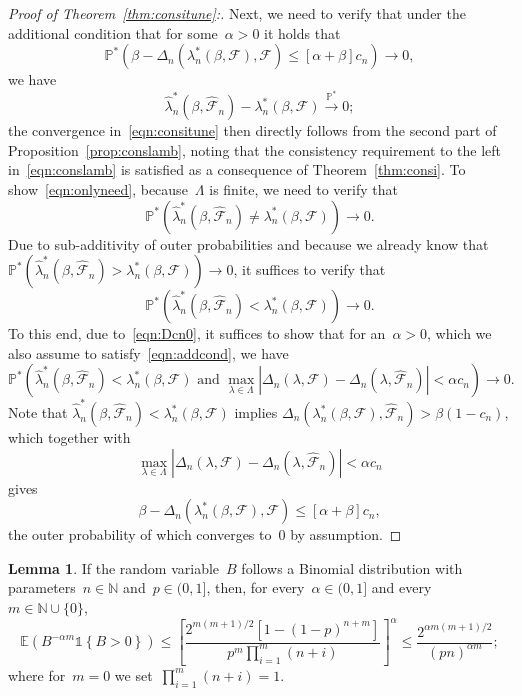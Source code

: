 \documentclass[11pt, a4paper]{article}
\newcommand{\N}{\mathbb{N}}
\newcommand{\cps}{\xrightarrow{\mathbb{P}^*}}
\theoremstyle{definition}
\newtheorem{lemma}[theorem]{Lemma}
\begin{document}
\begin{proof}[Proof of Theorem~\ref{thm:consitune}:]
Next, we need to verify that under the additional condition that for some~$\alpha > 0$ it holds that $$\mathbb{P}^*\left( \beta - \Delta_n\left(\lambda_n^*(\beta, \mathcal{F}), \mathcal{F}\right) \leq [\alpha + \beta]c_n \right) \to 0,$$ we have
\begin{equation}\label{eqn:onlyneed}
\hat{\lambda}_n^*(\beta, \hat{\mathcal{F}}_n) - \lambda_n^*(\beta, \mathcal{F}) \cps 0;
\end{equation}
the convergence in~\eqref{eqn:consitune} then directly follows from the second part of Proposition~\ref{prop:conslamb}, noting that the consistency requirement to the left in~\eqref{eqn:conslamb} is satisfied as a consequence of Theorem~\ref{thm:consi}. To show~\eqref{eqn:onlyneed}, because~$\Lambda$ is finite, we need to verify that $$\mathbb{P}^*\left( \hat{\lambda}_n^*(\beta, \hat{\mathcal{F}}_n) \neq \lambda_n^*(\beta, \mathcal{F}) \right) \to 0.$$ Due to sub-additivity of outer probabilities and because we already know that~$\mathbb{P}^*(\hat{\lambda}_n^*(\beta, \hat{\mathcal{F}}_n) > \lambda_n^*(\beta, \mathcal{F})) \to 0$, it suffices to verify that $$\mathbb{P}^*\left( \hat{\lambda}_n^*(\beta, \hat{\mathcal{F}}_n) < \lambda_n^*(\beta, \mathcal{F}) \right) \to 0.$$ To this end, due to~\eqref{eqn:Dcn0}, it suffices to show that for an~$\alpha > 0$, which we also assume to satisfy~\eqref{eqn:addcond}, we have $$\mathbb{P}^*\left( \hat{\lambda}_n^*(\beta, \hat{\mathcal{F}}_n) < \lambda_n^*(\beta, \mathcal{F}) \text{ and } \max_{\lambda \in \Lambda}|\Delta_n(\lambda, \mathcal{F}) - \Delta_n(\lambda, \hat{\mathcal{F}}_n)| < \alpha c_n \right) \to 0.$$ Note that $\hat{\lambda}_n^*(\beta, \hat{\mathcal{F}}_n) < \lambda_n^*(\beta, \mathcal{F})$ implies $\Delta_n(\lambda_n^*(\beta, \mathcal{F}), \hat{\mathcal{F}}_n) > \beta (1-c_n)$, which together with~$$\max_{\lambda \in \Lambda}|\Delta_n(\lambda, \mathcal{F}) - \Delta_n(\lambda, \hat{\mathcal{F}}_n)| < \alpha c_n$$ gives $$\beta - \Delta_n(\lambda_n^*(\beta, \mathcal{F}), \mathcal{F}) \leq [\alpha + \beta]c_n,$$ the outer probability of which converges to~$0$ by assumption.
\end{proof}

\begin{lemma}\label{lem:bin2}
If the random variable~$B$ follows a Binomial distribution with parameters~$n \in \N$ and~$p \in (0, 1]$, then, for every~$\alpha \in (0, 1]$ and every~$m \in \N \cup \{0\}$, 
%
\begin{equation}\label{in:bin}
\mathbb{E}\left(B^{-\alpha m} \mathds{1}\left\{B > 0\right\}\right) \leq \left[\frac{2^{m(m+1)/2}[1-(1-p)^{n+m}]}{p^m \prod_{i = 1}^m (n+i) }\right]^\alpha \leq \frac{2^{\alpha m(m+1)/2}}{(pn)^{\alpha m}};
\end{equation}
% 
where for~$m = 0$ we set~$\prod_{i = 1}^m (n+i) = 1$.
\end{lemma}
\end{document}

